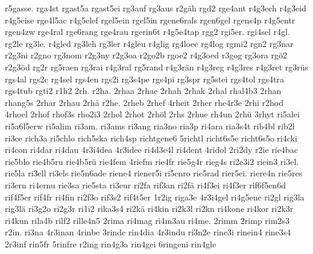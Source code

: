 {    r5gasse.
    rga4st
    rgast5a
    rgast5ei
    rg3auf
    rg3aus
    r2gäh
    rgd2
    rge4ant
    r4g3ech
    r4g3eid
    r4g5eise
    rge4l5ac
    r4g5elef
    rgel5ein
    rgel5in
    rgene6rals
    rgen6gel
    rgens4p
    r4g5entr
    rgen4zw
    rge4ral
    rge6rang
    rge4rau
    rgerin6t
    r4g5e4tap
    rgg2
    rgi5er.
    rgi4sel
    r4gl.
    rg2le
    rg3le.
    r4gled
    rg3leh
    rg3ler
    r4gleu
    r4glig
    rg4loec
    rg4log
    rgmi2
    rgn2
    rg3nar
    r2g3ni
    r2gno
    rg3nom
    r2g3ny
    r2g3oa
    r2go2b
    rgoe2
    r4g3oed
    r3gog
    rg3ora
    rgö2
    r2g3öd
    rg2r
    rg5raen
    rg3rai
    r4g3ral
    rg5rand
    r4g3rän
    r4g3reg
    r4g3res
    r4g3ret
    rg3rüs
    rgs4al
    rgs2c
    rg4sel
    rgs4en
    rgs2i
    rg3s4pe
    rgs4pi
    rg3spr
    rg5stei
    rgs4tol
    rgs4tra
    rgs4tub
    rgti2
    r1h2
    2rh.
    r2ha.
    2rhaa
    2rhae
    2rhah
    2rhak
    2rhal
    rhal4b3
    2rhan
    rhang5s
    2rhar
    2rhau
    2rhä
    r2he.
    2rheb
    2rhef
    4rheit
    2rher
    rhe4r3e
    2rhi
    r2hod
    4rhoel
    2rhof
    rhof3s
    rho2i3
    2rhol
    2rhot
    2rhöl
    2rhs
    2rhue
    rh4un
    2rhü
    3rhyt
    ri5alei
    ri5a6l5erw
    ri5alim
    ri3am.
    ri3ams
    ri3ang
    ria3no
    ria3p
    ri4ara
    ria3s4t
    rib4bl
    rib2l
    ri3ce
    rich3a
    ri5chlo
    rich5ska
    rich4sp
    richtgene6
    5richtl
    richt6s5e
    richt6s5o
    ri4cki
    ri4con
    ri4dar
    ri4dau
    4r3i4dea
    4r3idee
    ri4d3e4l
    ri4dent
    4ridol
    2ri2dy
    r2ie
    rie4bac
    rie5blo
    rie4b5ru
    rie4b5rü
    rie4fem
    4riefm
    rie4fr
    rie5g4r
    rieg4s
    ri2e3i2
    riein3
    ri3el.
    rie5la
    ri3ell
    ri3els
    rie5n6ade
    riene4
    riener5i
    ri5enro
    rie5rad
    rier5ei.
    riere4n
    rie5res
    ri3ern
    ri4ernu
    rie3sa
    rie5sta
    ri3eur
    ri2fa
    rif3an
    ri2fä
    ri4f3ei
    ri4f3er
    rif6f5en6d
    rif4f5er
    rif4fr
    ri4fin
    ri2f3o
    rif3s2
    rif4t5er
    1r2ig
    riga3e
    4r3i4gel
    ri4g5ene
    ri2gl
    rig3la
    rig3lä
    ri3g2o
    ri2g3r
    ri1i2
    rika3s4
    ri2kä
    ri4kin
    ri2k3l
    ri2kn
    ri4kone
    ri4kor
    ri2k3r
    ri4kun
    rila4b
    rilf2
    rille4n5
    2rima
    ri4mag
    ri4m3au
    ri4me.
    2rimm
    2rimp
    rim2s3
    r2in.
    ri3na
    4r3inan
    4rinbe
    3rinde
    rin4dia
    4r3indu
    ri3n2e
    rine3i
    rinein4
    rine3s4
    2r3inf
    rin5fr
    5rinfre
    r2ing
    rin4g3a
    rin4gei
    6ringeni
    rin4gle
}
